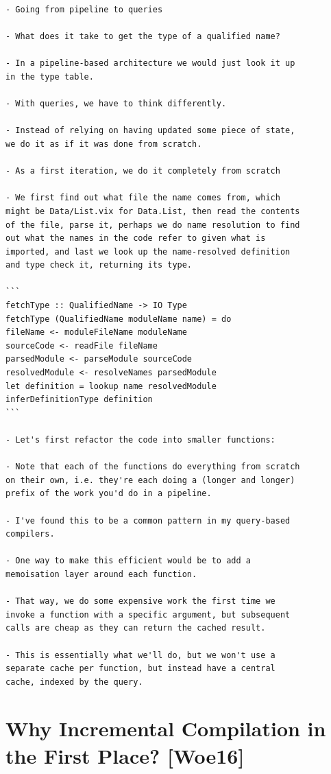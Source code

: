 \documentclass[12pt, a4paper]{report}
\begin{document}
\begin{verbatim}
- Going from pipeline to queries

- What does it take to get the type of a qualified name?

- In a pipeline-based architecture we would just look it up
in the type table.

- With queries, we have to think differently.

- Instead of relying on having updated some piece of state,
we do it as if it was done from scratch.

- As a first iteration, we do it completely from scratch

- We first find out what file the name comes from, which
might be Data/List.vix for Data.List, then read the contents
of the file, parse it, perhaps we do name resolution to find
out what the names in the code refer to given what is
imported, and last we look up the name-resolved definition
and type check it, returning its type.

```
fetchType :: QualifiedName -> IO Type
fetchType (QualifiedName moduleName name) = do
fileName <- moduleFileName moduleName
sourceCode <- readFile fileName
parsedModule <- parseModule sourceCode
resolvedModule <- resolveNames parsedModule
let definition = lookup name resolvedModule
inferDefinitionType definition
```

- Let's first refactor the code into smaller functions:

- Note that each of the functions do everything from scratch
on their own, i.e. they're each doing a (longer and longer)
prefix of the work you'd do in a pipeline.

- I've found this to be a common pattern in my query-based
compilers.

- One way to make this efficient would be to add a
memoisation layer around each function.

- That way, we do some expensive work the first time we
invoke a function with a specific argument, but subsequent
calls are cheap as they can return the cached result.

- This is essentially what we'll do, but we won't use a
separate cache per function, but instead have a central
cache, indexed by the query.
\end{verbatim}
\cite{olle_query_based}

\section*{Why Incremental Compilation in the First Place? [Woe16]}
\end{document}
